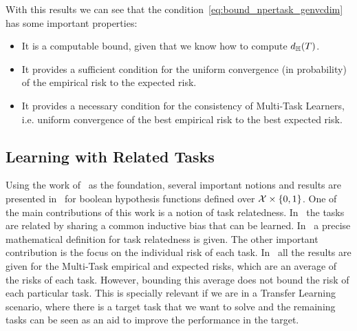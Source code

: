 With this results we can see that the condition~\eqref{eq:bound_npertask_genvcdim} has some important properties:
\begin{itemize}
    \item It is a computable bound, given that we know how to compute $d_{\mathbb{H}}(T)$.
    \item It provides a sufficient condition for the uniform convergence (in probability) of the empirical risk to the expected risk.
    \item It provides a necessary condition for the consistency of Multi-Task Learners, i.e. uniform convergence of the best empirical risk to the best expected risk.
\end{itemize}


\subsection{Learning with Related Tasks} %
Using the work of~\cite{baxter2000model} as the foundation, several important notions and results are presented in~\cite{Ben-DavidB08} for boolean hypothesis functions defined over $\mathcal{X} \times \left\{0, 1\right\}$.
One of the main contributions of this work is a notion of task relatedness. In~\cite{baxter2000model} the tasks are related by sharing a common inductive bias that can be learned. In~\cite{Ben-DavidB08} a precise mathematical definition for task relatedness is given.
The other important contribution is the focus on the individual risk of each task. In~\cite{baxter2000model} all the results are given for the Multi-Task empirical and expected risks, which are an average of the risks of each task. However, bounding this average does not bound the risk of each particular task. This is specially relevant if we are in a Transfer Learning scenario, where there is a target task that we want to solve and the remaining tasks can be seen as an aid to improve the performance in the target.

